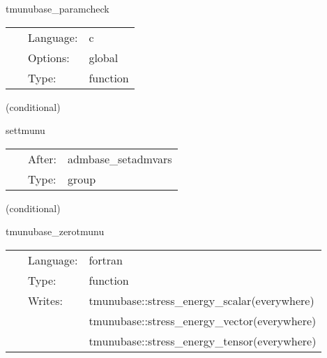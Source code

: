 \vspace{5mm}


\hspace{5mm} tmunubase\_paramcheck 

\hspace{5mm}{\it check that no deprecated parameters are used. } 


\hspace{5mm}

 \begin{tabular*}{160mm}{cll} 
~ & Language:  & c \\ 
~ & Options:  & global \\ 
~ & Type:  & function \\ 
\end{tabular*} 


\vspace{5mm}

   (conditional) 

\hspace{5mm} settmunu 

\hspace{5mm}{\it group for calculating the stress-energy tensor } 


\hspace{5mm}

 \begin{tabular*}{160mm}{cll} 
~ & After:  & admbase\_setadmvars \\ 
~ & Type:  & group \\ 
\end{tabular*} 


\vspace{5mm}

   (conditional) 

\hspace{5mm} tmunubase\_zerotmunu 

\hspace{5mm}{\it initialise the stress-energy tensor to zero } 


\hspace{5mm}

 \begin{tabular*}{160mm}{cll} 
~ & Language:  & fortran \\ 
~ & Type:  & function \\ 
~ & Writes:  & tmunubase::stress\_energy\_scalar(everywhere) \\ 
~& ~ &tmunubase::stress\_energy\_vector(everywhere)\\ 
~& ~ &tmunubase::stress\_energy\_tensor(everywhere)\\ 
\end{tabular*} 


